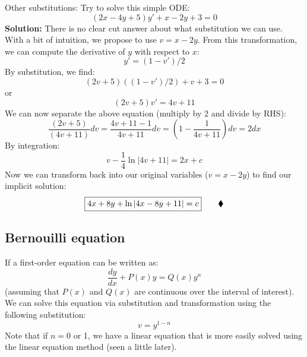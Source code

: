 \begin{exmp}{Other substitutions:}
Try to solve this simple ODE:
\begin{equation}
\left(2x-4y+5\right)y' +x-2y+3=0
\end{equation}
\textbf{Solution:}
There is no clear cut answer about what substitution we can use. With a bit of intuition, we propose to use $v=x-2y$. From this transformation, we can compute the derivative of $y$ with respect to $x$:
\begin{equation*}
y'=(1-v')/2
\end{equation*}
By substitution, we find:
\begin{equation}
\left(2v+5\right)((1-v')/2) +v+3=0
\end{equation}
or
\begin{equation}
\left(2v+5\right)v' =4v+11
\end{equation}
We can now separate the above equation (multiply by 2 and divide by RHS):
\begin{equation}
\frac{\left(2v+5\right)}{\left(4v+11\right)}dv  =\frac{4v+11-1}{4v+11}dv=\left(1-\frac{1}{4v+11}\right)dv =2dx
\end{equation}
By integration:
\begin{equation}
v-\frac{1}{4}\ln\left|4v+11\right|=2x+c
\end{equation}
Now we can transform back into our original variables ($v=x-2y$) to find our implicit solution:
\begin{equation*}
\boxed{4x+8y+\ln\left|4x-8y+11\right|=c} \qquad \mathbin{\blacklozenge}
\end{equation*}

\end{exmp}

\subsection{Bernouilli equation }
If a first-order equation can be written as:
\begin{equation}
\frac{dy}{dx}+P(x)y=Q(x)y^n
\end{equation}
(assuming that $P(x)$ and $Q(x)$ are continuous over the interval of interest). We can solve this equation via substitution and transformation using the following substitution:
\begin{equation}
v=y^{1-n}
\end{equation}
Note that if $n=0$ or 1, we have a linear equation that is more easily solved using the linear equation method (seen a little later).

\updateinfo[September 19, 2018]